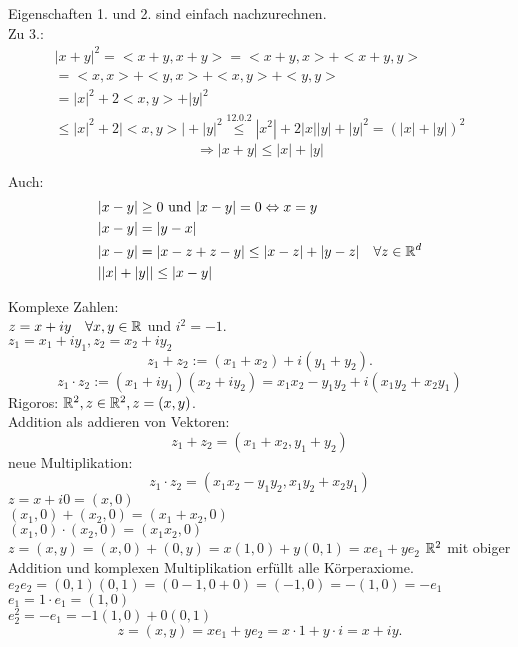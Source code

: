 \documentclass[../ana1.tex]{subfiles}
\begin{document}
\begin{bew}
	Eigenschaften 1. und 2. sind einfach nachzurechnen.\\
	Zu 3.:
	\begin{align*}
		|x+y|^2 = <x+y,x+y>=<x+y,x>+<x+y,y>\\
		= <x,x> + <y,x> + <x,y> + <y,y>\\
		=|x|^2 + 2<x,y> + |y|^2\\
		\leq |x|^2 + 2|<x,y>| + |y|^2 \overset{12.0.2}{\leq} |x^2| + 2|x||y| + |y|^2 = (|x|+|y|)^2
	\end{align*}
	\[ \Rightarrow |x+y| \leq |x| + |y| \]
\end{bew}
\begin{bem}
	Auch:
	\begin{align*}
		&|x - y| \geq 0 \text{ und } |x - y| = 0 \Leftrightarrow x = y\\
		&|x - y| = |y - x|\\
		&|x - y| = |x-z + z-y| \leq |x - z| + |y - z| \quad \forall z \in \mathbb{R}^d\\
		&||x| + |y|| \leq |x - y|
	\end{align*}
\end{bem}
Komplexe Zahlen:\\
\( z=x+iy \quad\forall x,y\in\mathbb{R} \) und \( i^2 = -1 \).\\
\( z_1 = x_1 + i y_1, z_2 = x_2 + i y_2 \)
\[ z_1 + z_2 := (x_1 + x_2) + i(y_1 + y_2). \]
\[ z_1 \cdot z_2 := (x_1 + i y_1)(x_2 + i y_2) = x_1x_2 - y_1y_2 + i(x_1y_2 + x_2y_1) \]
Rigoros: \( \mathbb{R}^2, z\in\mathbb{R}^2, z=(x,y) \).\\
Addition als addieren von Vektoren: \[ z_1 + z_2 = (x_1 + x_2, y_1 + y_2) \]
neue Multiplikation: \[ z_1 \cdot z_2 = (x_1 x_2 - y_1y_2, x_1y_2 + x_2y_1) \]
\( z = x+i 0 = (x,0) \)\\
\( (x_1,0) + (x_2,0) = (x_1+x_2,0) \)\\
\( (x_1,0)\cdot(x_2,0) = (x_1x_2,0) \)\\
\( z=(x,y) = (x,0) + (0,y) = x(1,0) + y(0,1) = x e_1 + y e_2 \)
\( \mathbb{R}^2 \) mit obiger Addition und \glqq komplexen \grqq{} Multiplikation erfüllt alle Körperaxiome.\\
\( e_2 e_2 = (0,1)(0,1) = (0-1,0 + 0) = (-1,0) = -(1,0) = -e_1 \)\\
\(e_1 = 1\cdot e_1 = (1,0) \)\\
\( e_2^2 = -e_1 = -1 (1,0) + 0(0,1) \)
\[ z = (x,y) = x e_1 + y e_2 = x \cdot 1 + y \cdot i = x + i y. \]
\end{document}
